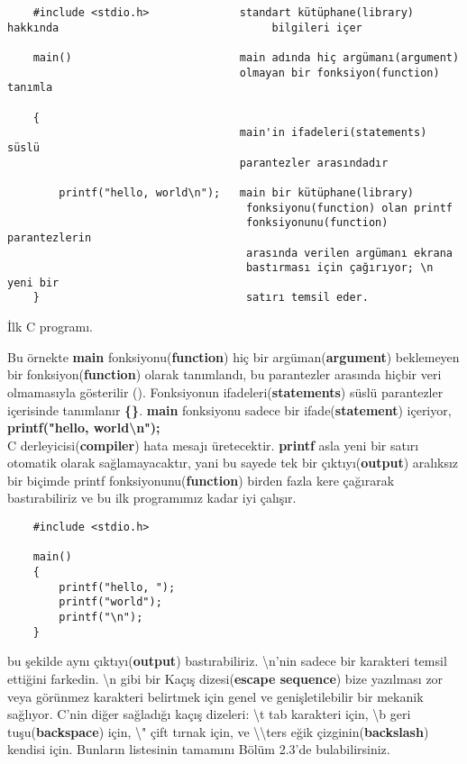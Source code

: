 \documentclass[a4paper,12pt,oneside]{book}
\begin{document}
\begin{lstlisting}
    #include <stdio.h>              standart kütüphane(library) hakkında                                 bilgileri içer

    main()                          main adında hiç argümanı(argument)
                                    olmayan bir fonksiyon(function) tanımla

    {
                                    main'in ifadeleri(statements) süslü
                                    parantezler arasındadır

        printf("hello, world\n");   main bir kütüphane(library)
                                     fonksiyonu(function) olan printf
                                     fonksiyonunu(function) parantezlerin
                                     arasında verilen argümanı ekrana
                                     bastırması için çağırıyor; \n yeni bir
    }                                satırı temsil eder.
\end{lstlisting}
\begin{center}İlk C programı.\end{center}
\pagebreak

Bu örnekte \textbf{main} fonksiyonu(\textbf{function}) hiç bir argüman(\textbf{argument}) beklemeyen bir fonksiyon(\textbf{function}) olarak tanımlandı, bu parantezler arasında hiçbir veri olmamasıyla gösterilir ().
Fonksiyonun ifadeleri(\textbf{statements}) süslü parantezler içerisinde tanımlanır \textbf{\{\}}. \textbf{main} fonksiyonu sadece bir ifade(\textbf{statement}) içeriyor, \\

\textbf{printf("hello, world\textbackslash n");} \\

C derleyicisi(\textbf{compiler}) hata mesajı üretecektir.
\textbf{printf} asla yeni bir satırı otomatik olarak sağlamayacaktır, yani bu sayede tek bir çıktıyı(\textbf{output}) aralıksız bir biçimde printf fonksiyonunu(\textbf{function}) birden fazla kere çağırarak bastırabiliriz ve bu ilk programımız kadar iyi çalışır.

\begin{lstlisting}
    #include <stdio.h>

    main()
    {
        printf("hello, ");
        printf("world");
        printf("\n");
    }
\end{lstlisting}

bu şekilde aynı çıktıyı(\textbf{output}) bastırabiliriz.
\textbackslash n'nin sadece bir karakteri temsil ettiğini farkedin. \textbackslash n  gibi bir Kaçış dizesi(\textbf{escape sequence}) bize yazılması zor veya görünmez karakteri belirtmek için genel ve genişletilebilir bir mekanik sağlıyor. C'nin diğer sağladığı kaçış dizeleri: \textbackslash t tab karakteri için, \textbackslash b geri tuşu(\textbf{backspace}) için, \textbackslash " çift tırnak için, ve  \textbackslash \textbackslash \hspace*{1mm}ters eğik çizginin(\textbf{backslash}) kendisi için. Bunların listesinin tamamını Bölüm 2.3'de bulabilirsiniz. \\
\end{document}
